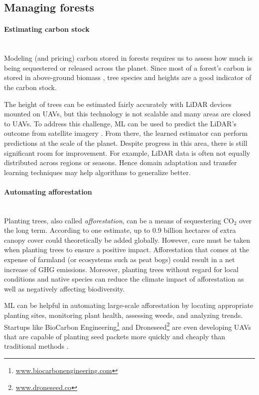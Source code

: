 \documentclass[11pt]{report}
\newcommand{\Gap}{\texorpdfstring{\hfill}{}}
\newcommand{\Rec}{\texorpdfstring{{\small\emph{\color{blue}{\fbox{High Leverage}}}}}{}}
\newcommand{\HighRisk}{\texorpdfstring{{\small\emph{\color{orange}{\fbox{Uncertain Impact}}}}}{}}
\newcommand{\Longterm}{\texorpdfstring{{\small\emph{\color{OliveGreen}{\fbox{Long-term}}}}}{}}
\newcommand{\cd}{CO$_2$\xspace}
\begin{document}
\subsection{Managing forests}\label{sec:forests}

\paragraph{Estimating carbon stock}\Gap\textbf{\Rec}\mbox{}\\
Modeling (and pricing) carbon stored in forests requires us to assess how much is being sequestered or released across the planet. Since most of a forest's carbon is stored in above-ground biomass \cite{rodriguez2017quantifying}, tree species and heights are a good indicator of the carbon stock. 

The height of trees can be estimated fairly accurately with LiDAR devices mounted on UAVs, but this technology is not scalable and many areas are closed to UAVs. To address this challenge, ML can be used to predict the LiDAR's outcome from satellite imagery \cite{planetCarbonStock, rodriguez2017quantifying}. From there, the learned estimator can perform predictions at the scale of the planet. Despite progress in this area, there is still significant room for improvement. For example, LiDAR data is often not equally distributed across regions or seasons. Hence domain adaptation and transfer learning techniques may help algorithms to generalize better. 

\paragraph{Automating afforestation}\Gap\textbf{\Longterm\HighRisk}\mbox{}\\
Planting trees, also called \emph{afforestation}, can be a means of sequestering \cd over the long term. According to one estimate, up to 0.9 billion hectares of extra canopy cover could theoretically be added \cite{Bastin76} globally.  However, care must be taken when planting trees to ensure a positive impact. Afforestation that comes at the expense of farmland (or ecosystems such as peat bogs) could result in a net increase of GHG emissions. Moreover, planting trees without regard for local conditions and native species can reduce the climate impact of afforestation as well as negatively affecting biodiversity.  

ML can be helpful in automating large-scale afforestation by locating appropriate planting sites, monitoring plant health, assessing weeds, and analyzing trends. Startups like BioCarbon Engineering\footnote{\url{www.biocarbonengineering.com}} and Droneseed\footnote{\url{www.droneseed.co}} are even developing UAVs that are capable of planting seed packets more quickly and cheaply than traditional methods \cite{biocarbonengineeringInterview}.
\end{document}
